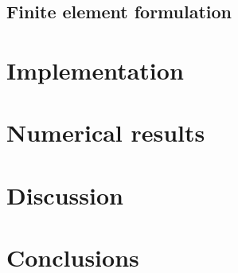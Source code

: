 \documentclass[11pt,a4paper,titlepage]{report}
\begin{document}
\section{Finite element formulation}

\chapter{Implementation}

\chapter{Numerical results}

\chapter{Discussion}

\chapter{Conclusions}
\end{document}
